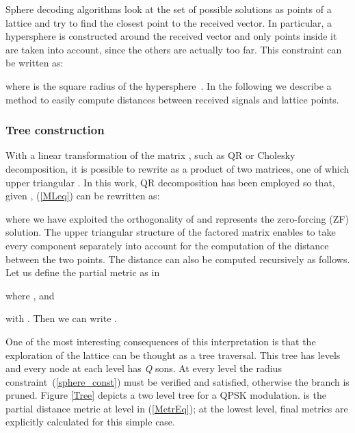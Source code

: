 \documentclass[12pt,onecolumn,draftclsnofoot]{IEEEtran}
\begin{document}
Sphere decoding algorithms look at the set of  possible solutions as
points of a lattice and try to find the closest point to the
received vector. In particular, a hypersphere is constructed around
the received vector and only points inside it are taken into
account, since the others are actually too far. This constraint can
be written as:

where  is the square radius of the
hypersphere~\cite{Pohst,Viterbo93,Viterbo99}.  In the following we
describe a method to  easily compute distances between received
signals and lattice points.

\subsubsection{Tree construction}
With a linear transformation of the matrix , such as
QR or Cholesky decomposition, it is possible to rewrite
 as a product of two matrices, one of which upper
triangular \cite{Caire&ot1}. In this work, QR decomposition has been
employed so that, given ,
(\ref{MLeq}) can be rewritten as:

where we have exploited the orthogonality of  and
 represents the
zero-forcing (ZF) solution. The upper triangular structure of the
factored matrix enables to take every component separately into
account for the computation of the distance between the two points.
The distance  can also be computed recursively as follows. Let
us define the partial metric as in~\cite{ethvlsi}

where , and

\noindent with . Then we can
write .

One of the most interesting consequences of this interpretation is
that the exploration of the lattice can be thought as a tree
traversal. This tree has  levels and every node at each level has
\emph{Q} sons. At every level the radius
constraint~(\ref{sphere_const}) must be verified and satisfied,
otherwise the branch is pruned. Figure \ref{Tree} depicts a two
level tree for a QPSK modulation.  is the partial distance metric at
level  in (\ref{MetrEq}); at the lowest level, final metrics are explicitly
calculated for this simple case.
\end{document}

